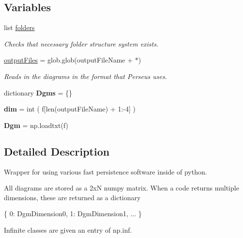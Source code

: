 \subsection*{Variables}
\begin{DoxyCompactItemize}
\item
list \hyperlink{namespaceteaspoon_1_1_t_d_a_1_1_persistence_a5d89c08933153d3fea60fd71e9e16800}{folders}
\begin{DoxyCompactList}\small\item\em Checks that necessary folder structure system exists. \end{DoxyCompactList}\item
\hyperlink{namespaceteaspoon_1_1_t_d_a_1_1_persistence_ae41c85513e98b32d96c75124929c4d2c}{output\+Files} = glob.\+glob(output\+File\+Name + \textquotesingle{}$\ast$\textquotesingle{})
\begin{DoxyCompactList}\small\item\em Reads in the diagrams in the format that Perseus uses. \end{DoxyCompactList}\item
\mbox{\label{namespaceteaspoon_1_1_t_d_a_1_1_persistence_a23124e4420ddc7cc2be201af0d46f384}}
dictionary {\bfseries Dgms} = \{\}
\item
\mbox{\label{namespaceteaspoon_1_1_t_d_a_1_1_persistence_a401a006d9a9151a63298278d463f7973}}
{\bfseries dim} = int ( f\mbox{[}len(output\+File\+Name) + 1\+:-\/4\mbox{]} )
\item
\mbox{\label{namespaceteaspoon_1_1_t_d_a_1_1_persistence_ad755079d8b56f84312c5e4f23db15f19}}
{\bfseries Dgm} = np.\+loadtxt(f)
\end{DoxyCompactItemize}


\subsection{Detailed Description}
Wrapper for using various fast persistence software inside of python.

All diagrams are stored as a 2xN numpy matrix. When a code returns multiple dimensions, these are returned as a dictionary
\begin{DoxyCode}
\{
    0: DgmDimension0,
    1: DgmDimension1,
    ...
\}
\end{DoxyCode}
 Infinite classes are given an entry of np.\+inf.

